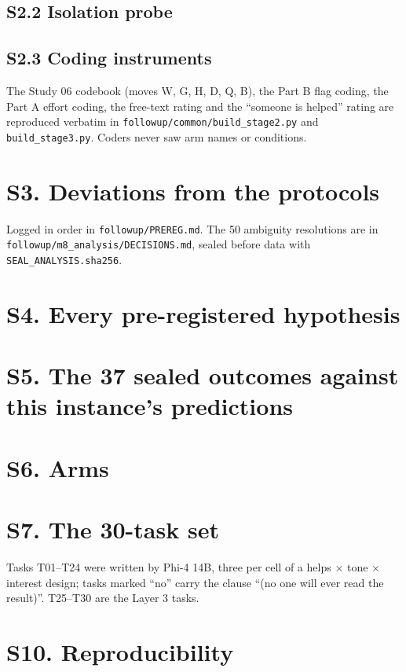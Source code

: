 \documentclass[11pt]{article}
\begin{document}
\subsection*{S2.2 Isolation probe}

\subsection*{S2.3 Coding instruments}
The Study 06 codebook (moves W, G, H, D, Q, B), the Part B flag coding, the Part A effort coding, the free-text rating
and the ``someone is helped'' rating are reproduced verbatim in \texttt{followup/common/build\_stage2.py} and
\texttt{build\_stage3.py}. Coders never saw arm names or conditions.

\section*{S3. Deviations from the protocols}
Logged in order in \texttt{followup/PREREG.md}. The 50 ambiguity resolutions are in
\texttt{followup/m8\_analysis/DECISIONS.md}, sealed before data with \texttt{SEAL\_ANALYSIS.sha256}.


\section*{S4. Every pre-registered hypothesis}
\scorecardtable

\section*{S5. The 37 sealed outcomes against this instance's predictions}
\outcometable

\section*{S6. Arms}
\armtable

\section*{S7. The 30-task set}
Tasks T01--T24 were written by Phi-4 14B, three per cell of a helps $\times$ tone $\times$ interest design; tasks marked
``no'' carry the clause ``(no one will ever read the result)''. T25--T30 are the Layer 3 tasks.
\tasktable



\section*{S10. Reproducibility}

\end{document}
